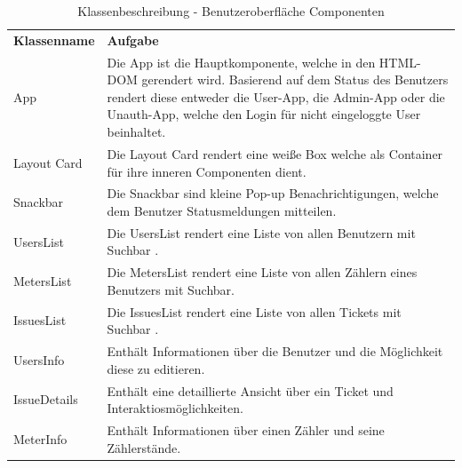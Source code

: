 \begin{table}[H]
	\centering
	\begin{tabularx}{\textwidth}{X X}
	\rowcolor[HTML]{C0C0C0} 
	\textbf{Klassenname} & \textbf{Aufgabe} \\
	App & Die App ist die Hauptkomponente, welche in den HTML-DOM gerendert wird. Basierend auf dem Status des Benutzers rendert diese entweder die User-App, die Admin-App oder die Unauth-App, welche den Login für nicht eingeloggte User beinhaltet. \\
	\rowcolor[HTML]{E7E7E7} 
	Layout Card & Die Layout Card rendert eine weiße Box welche als Container für ihre inneren Componenten dient.  \\
	Snackbar & Die Snackbar sind kleine Pop-up Benachrichtigungen, welche dem Benutzer Statusmeldungen mitteilen.  \\
	\rowcolor[HTML]{E7E7E7} 
	UsersList & Die UsersList rendert eine Liste von allen Benutzern mit Suchbar . \\
	MetersList & Die MetersList rendert eine Liste von allen Zählern eines Benutzers mit Suchbar. \\
	\rowcolor[HTML]{E7E7E7} 
	IssuesList & Die IssuesList rendert eine Liste von allen Tickets mit Suchbar .\\
	UsersInfo & Enthält Informationen über die Benutzer und die Möglichkeit diese zu editieren. \\
	\rowcolor[HTML]{E7E7E7} 
	IssueDetails & Enthält eine detaillierte Ansicht über ein Ticket und Interaktiosmöglichkeiten.\\
	MeterInfo & Enthält Informationen über einen Zähler und seine Zählerstände.
\end{tabularx}
	\caption{Klassenbeschreibung - Benutzeroberfläche Componenten}
	\label{table:klassenbeschreibung-ui}
\end{table}
 
